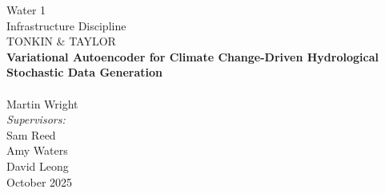 \begin{titlepage}
\begin{center}

{ \large
	Water 1      \\
	Infrastructure Discipline \\
	TONKIN \& TAYLOR 
} \\[3cm]

{ \huge \bfseries 
	Variational Autoencoder for Climate Change-Driven Hydrological Stochastic Data Generation
} \\[0.5cm]

\HRule \\[3cm]

{ \large
	Martin Wright						
} \\[3cm]
{ 
	\emph{Supervisors:}					\\
	Sam Reed						\\
    Amy Waters                  \\
	David Leong					\\[3cm]
	October 2025
}


\end{center}
\end{titlepage}